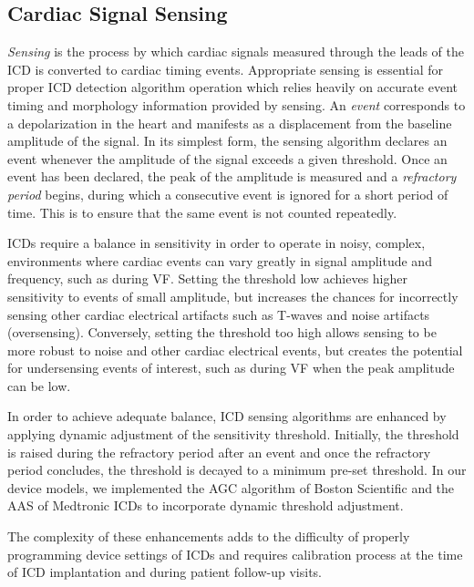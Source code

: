 \subsection{Cardiac Signal Sensing}
\label{sec:sensing}

\emph{Sensing} is the process by which cardiac signals measured through the leads of the \ac{ICD} is converted to cardiac timing events.
Appropriate sensing is essential for proper \ac{ICD} detection algorithm operation which relies heavily on accurate event timing and morphology information provided by sensing. 
An \emph{event} corresponds to a depolarization in the heart and manifests as a displacement from the baseline amplitude of the signal.
In its simplest form, the sensing algorithm declares an event whenever the amplitude of the signal exceeds a given threshold.
Once an event has been declared, the peak of the amplitude is measured and a \emph{refractory period} begins, during which a consecutive event is ignored for a short period of time. 
This is to ensure that the same event is not counted repeatedly.

\ac{ICD}s require a balance in sensitivity in order to operate in noisy, complex, environments where cardiac events can vary greatly in signal amplitude and frequency, such as during \ac{VF}. 
Setting the threshold low achieves higher sensitivity to events of small amplitude, but increases the chances for incorrectly sensing other cardiac electrical artifacts such as T-waves and noise artifacts (oversensing). 
Conversely, setting the threshold too high allows sensing to be more robust to noise and other cardiac electrical events, but creates the potential for undersensing events of interest, such as during \ac{VF} when the peak amplitude can be low. 

In order to achieve adequate balance, \ac{ICD} sensing algorithms are enhanced by applying dynamic adjustment of the sensitivity threshold.
Initially, the threshold is raised during the refractory period after an event and once the refractory period concludes, the threshold is decayed to a minimum pre-set threshold.
In our device models, we implemented the \ac{AGC} algorithm of Boston Scientific and the \ac{AAS} of Medtronic \ac{ICD}s to incorporate dynamic threshold adjustment. 


The complexity of these enhancements adds to the difficulty of properly programming device settings of \ac{ICD}s and requires calibration process at the time of \ac{ICD} implantation and during patient follow-up visits.